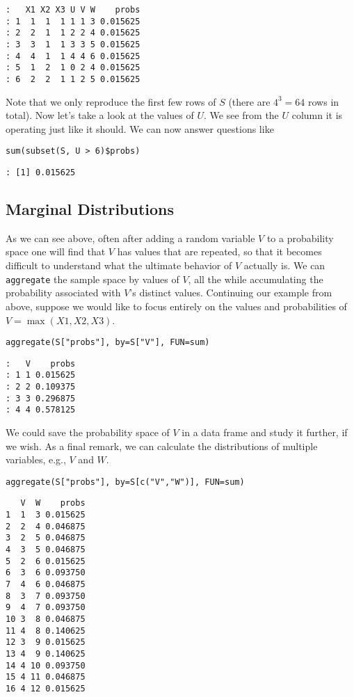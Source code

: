 \begin{verbatim}
:   X1 X2 X3 U V W    probs
: 1  1  1  1 1 1 3 0.015625
: 2  2  1  1 2 2 4 0.015625
: 3  3  1  1 3 3 5 0.015625
: 4  4  1  1 4 4 6 0.015625
: 5  1  2  1 0 2 4 0.015625
: 6  2  2  1 1 2 5 0.015625
\end{verbatim}

Note that we only reproduce the first few rows of \(S\) (there are \(4^{3}=64\) rows in total).
Now let's take a look at the values of \(U\).
We see from the \(U\) column it is operating just like it should.
We can now answer questions like

\begin{Verbatim}
sum(subset(S, U > 6)$probs)
\end{Verbatim}

\begin{verbatim}
: [1] 0.015625
\end{verbatim}

\subsection{Marginal Distributions}
\label{sec-4-9-2}

As we can see above, often after adding a random variable \(V\) to a
probability space one will find that \(V\) has values that are
repeated, so that it becomes difficult to understand what the ultimate
behavior of \(V\) actually is.
We can \texttt{aggregate} the sample space by values of \(V\), all the
while accumulating the probability associated with \(V\)'s distinct
values. Continuing our example from above, suppose we would like to
focus entirely on the values and probabilities of
\(V=\max(X1,X2,X3)\).

\begin{Verbatim}
aggregate(S["probs"], by=S["V"], FUN=sum)
\end{Verbatim}

\begin{verbatim}
:   V    probs
: 1 1 0.015625
: 2 2 0.109375
: 3 3 0.296875
: 4 4 0.578125
\end{verbatim}

We could save the probability space of \(V\) in a data frame and study
it further, if we wish. As a final remark, we can calculate the
distributions of multiple variables, e.g., \(V\) and \(W\).

\begin{Verbatim}
aggregate(S["probs"], by=S[c("V","W")], FUN=sum)
\end{Verbatim}

\begin{verbatim}
   V  W    probs
1  1  3 0.015625
2  2  4 0.046875
3  2  5 0.046875
4  3  5 0.046875
5  2  6 0.015625
6  3  6 0.093750
7  4  6 0.046875
8  3  7 0.093750
9  4  7 0.093750
10 3  8 0.046875
11 4  8 0.140625
12 3  9 0.015625
13 4  9 0.140625
14 4 10 0.093750
15 4 11 0.046875
16 4 12 0.015625
\end{verbatim}
